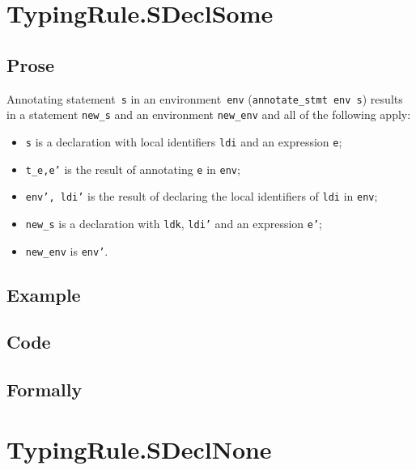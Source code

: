 \documentclass{book}
\begin{document}
\section{TypingRule.SDeclSome \label{sec:TypingRule.SDeclSome}}

  \subsection{Prose}
Annotating statement~\texttt{s} in an environment~\texttt{env}
(\texttt{annotate\_stmt env s}) results in a statement \texttt{new\_s} and an
environment \texttt{new\_env} and all of the following apply:
   \begin{itemize}
   \item \texttt{s} is a declaration with local identifiers \texttt{ldi} and an expression \texttt{e};
   \item \texttt{t\_e,e'} is the result of annotating \texttt{e} in \texttt{env};
   \item \texttt{env', ldi'} is the result of declaring the local identifiers of \texttt{ldi} in \texttt{env};
   \item \texttt{new\_s} is a declaration with \texttt{ldk}, \texttt{ldi'} and an expression \texttt{e'};
   \item \texttt{new\_env} is \texttt{env'}.
   \end{itemize}

  \subsection{Example}

  \subsection{Code}

\begin{emptyformal}
    \subsection{Formally}
\end{emptyformal}


\section{TypingRule.SDeclNone \label{sec:TypingRule.SDeclNone}}
\end{document}
